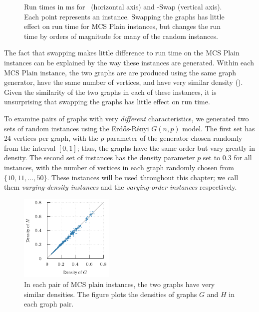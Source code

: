 \begin{figure}[htb]
{        \label{subfig:runtime-swapping-scatter-random3}
    }
    \caption{Run times in ms for \McSplit\ (horizontal axis) and \McSplit-Swap
        (vertical axis).  Each point represents an instance.  Swapping the graphs
        has little effect on run time
        for MCS Plain instances, but changes the run time by orders of magnitude
        for many of the random instances.}\label{figure:runtime-swapping-scatter}
\end{figure}

The fact that swapping makes little difference to run time on the MCS Plain
instances can be explained by the way these instances are generated.  Within
each MCS Plain instance, the two graphs are are produced using the same graph
generator, have the same number of vertices, and have very similar density
().  Given the similarity of the two graphs in
each of these instances, it is unsurprising that swapping the graphs has little
effect on run time.

To examine pairs of graphs with very \emph{different} characteristics, we
generated two sets of random instances using the Erd\H{o}s-Rényi $G(n,p)$ model.
The first set has 24 vertices per graph, with the $p$ parameter of the
generator chosen randomly from the interval $[0,1]$; thus, the graphs have the
same order but vary greatly in density.  The second set of instances has the
density parameter $p$ set to $0.3$ for all instances, with the number of
vertices in each graph randomly chosen from $\{10, 11, \dots, 50\}$.  These
instances will be used throughout this chapter; we call them
\emph{varying-density instances} and the \emph{varying-order instances}
respectively.

\begin{figure}[htb]
    \centering
    \includegraphics*[width=0.4\textwidth]{14-mcsplit-i-undirected/modified-mcsplit-experiment/plots/plots/mcsplain-densities}
    \caption{In each pair of MCS plain instances, the two graphs have very similar densities. The figure
        plots the densities of graphs $G$ and $H$ in each graph pair.}
    \label{figure:mcsplain-densities}
\end{figure}

